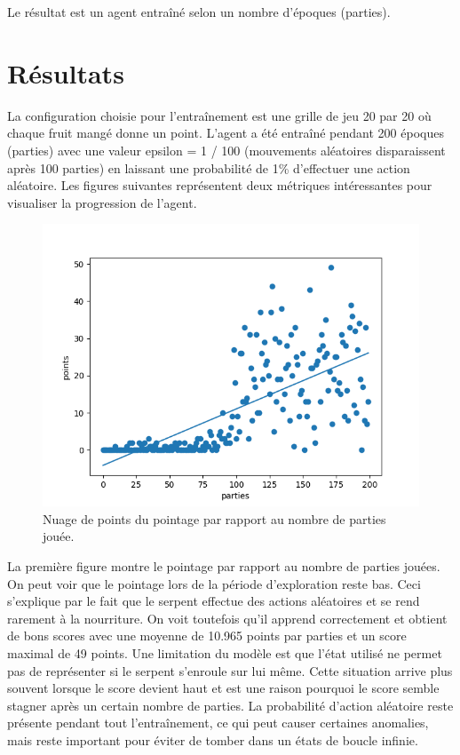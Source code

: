 \documentclass{article}
\begin{document}
Le résultat est un agent entraîné selon un nombre d'époques (parties).

\section{Résultats}

La configuration choisie pour l'entraînement est une grille de jeu 20 par 20 où chaque fruit mangé donne un point. L’agent a été entraîné pendant 200 époques (parties) avec une valeur epsilon = 1 / 100 (mouvements aléatoires disparaissent après 100 parties) en laissant une probabilité de 1\% d'effectuer une action aléatoire. Les figures suivantes représentent deux métriques intéressantes pour visualiser la progression de l'agent.

\begin{figure}[ht]
	\includegraphics[width=\linewidth]{scatter_score_200_games.png}
	\caption{Nuage de points du pointage par rapport au nombre de parties jouée.}
	\label{fig:Snake}
\end{figure}

La première figure montre le pointage par rapport au nombre de parties jouées. On peut voir que le pointage lors de la période d’exploration reste bas. Ceci  s'explique par le fait que le serpent effectue des actions aléatoires et se rend rarement à la nourriture. On voit toutefois qu’il apprend correctement et obtient de bons scores avec une moyenne de 10.965 points par parties et un score maximal de 49 points. Une limitation du modèle est que l’état utilisé ne permet pas de représenter si le serpent s’enroule sur lui même. Cette situation arrive plus souvent lorsque le score devient haut et est une raison pourquoi le score semble stagner après un certain nombre de parties. La probabilité d’action aléatoire reste présente pendant tout l'entraînement, ce qui peut causer certaines anomalies, mais reste important pour éviter de tomber dans un états de boucle infinie.
\end{document}
